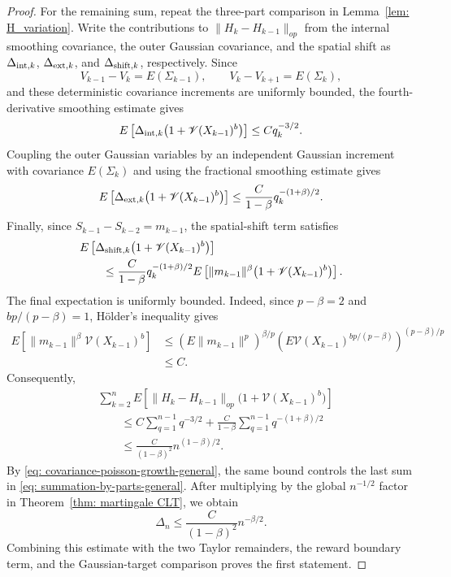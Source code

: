 \documentclass[11pt]{article}
\newcommand{\ve}{\mathscr{V}}
\begin{document}
\begin{proof}
For the remaining sum, repeat the three-part comparison in
Lemma~\ref{lem: H_variation}. Write the contributions to
$\|H_k-H_{k-1}\|_{op}$ from the internal smoothing covariance, the outer
Gaussian covariance, and the spatial shift as
$\Delta_{{\rm int},k}$, $\Delta_{{\rm ext},k}$, and
$\Delta_{{\rm shift},k}$, respectively. Since
\[
    V_{k-1}-V_k=E(\Sigma_{k-1}),
    \qquad
    V_k-V_{k+1}=E(\Sigma_k),
\]
and these deterministic covariance increments are uniformly bounded, the
fourth-derivative smoothing estimate gives
\[
E\left[
    \Delta_{{\rm int},k}
    \bigl(1+\ve(X_{k-1})^b\bigr)
\right]
\leq
Cq_k^{-3/2}.
\]
Coupling the outer Gaussian variables by an independent Gaussian increment
with covariance $E(\Sigma_k)$ and using the fractional smoothing estimate
gives
\[
E\left[
    \Delta_{{\rm ext},k}
    \bigl(1+\ve(X_{k-1})^b\bigr)
\right]
\leq
\frac{C}{1-\beta}q_k^{-(1+\beta)/2}.
\]
Finally, since $S_{k-1}-S_{k-2}=m_{k-1}$, the spatial-shift term satisfies
\begin{align*}
&E\left[
    \Delta_{{\rm shift},k}
    \bigl(1+\ve(X_{k-1})^b\bigr)
\right]\\
&\qquad\leq
\frac{C}{1-\beta}q_k^{-(1+\beta)/2}
E\left[
    \|m_{k-1}\|^\beta
    \bigl(1+\ve(X_{k-1})^b\bigr)
\right].
\end{align*}
The final expectation is uniformly bounded. Indeed, since $p-\beta=2$ and
$bp/(p-\beta)=1$, H\"older's inequality gives
\begin{align*}
E\left[\|m_{k-1}\|^\beta\ve(X_{k-1})^b\right]
&\leq
\left(E\|m_{k-1}\|^p\right)^{\beta/p}
\left(E\ve(X_{k-1})^{bp/(p-\beta)}\right)^{(p-\beta)/p}\\
&\leq C.
\end{align*}
Consequently,
\begin{align*}
&\sum_{k=2}^n
E\left[
    \|H_k-H_{k-1}\|_{op}
    \bigl(1+\ve(X_{k-1})^b\bigr)
\right]\\
&\qquad\leq
C\sum_{q=1}^{n-1}q^{-3/2}
+
\frac{C}{1-\beta}
\sum_{q=1}^{n-1}q^{-(1+\beta)/2}\\
&\qquad\leq
\frac{C}{(1-\beta)^2}n^{(1-\beta)/2}.
\end{align*}
By \eqref{eq: covariance-poisson-growth-general}, the same bound controls
the last sum in \eqref{eq: summation-by-parts-general}. After multiplying by
the global $n^{-1/2}$ factor in Theorem~\ref{thm: martingale CLT}, we obtain
\[
    \Delta_n
    \leq
    \frac{C}{(1-\beta)^2}n^{-\beta/2}.
\]
Combining this estimate with the two Taylor remainders, the reward boundary
term, and the Gaussian-target comparison proves the first statement.


\end{proof}
\end{document}
